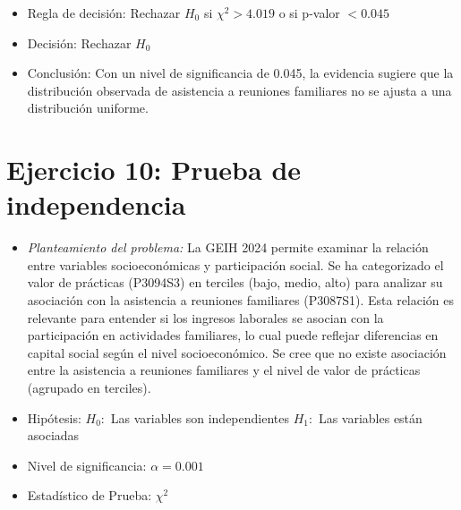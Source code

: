 \documentclass[12pt,a4paper]{article}
\begin{document}
\begin{itemize}
    \item Regla de decisión: Rechazar $H_0$ si $\chi^2 > 4.019$ o si p-valor $< 0.045$
    \item Decisión: Rechazar $H_0$
    \item Conclusión: Con un nivel de significancia de 0.045, la evidencia sugiere que la distribución observada de asistencia a reuniones familiares no se ajusta a una distribución uniforme.
\end{itemize}

\section*{Ejercicio 10: Prueba de independencia}
\begin{itemize}
    \item \textit{Planteamiento del problema:} La GEIH 2024 permite examinar la relación entre variables socioeconómicas y participación social. Se ha categorizado el valor de prácticas (P3094S3) en terciles (bajo, medio, alto) para analizar su asociación con la asistencia a reuniones familiares (P3087S1). Esta relación es relevante para entender si los ingresos laborales se asocian con la participación en actividades familiares, lo cual puede reflejar diferencias en capital social según el nivel socioeconómico. Se cree que no existe asociación entre la asistencia a reuniones familiares y el nivel de valor de prácticas (agrupado en terciles).
    \item Hipótesis: \quad $H_{0}:$ Las variables son independientes \hspace{2cm} $H_{1}:$ Las variables están asociadas
    \item Nivel de significancia: $\alpha = 0.001$
    \item Estadístico de Prueba: $\chi^2$
\end{itemize}
\end{document}
